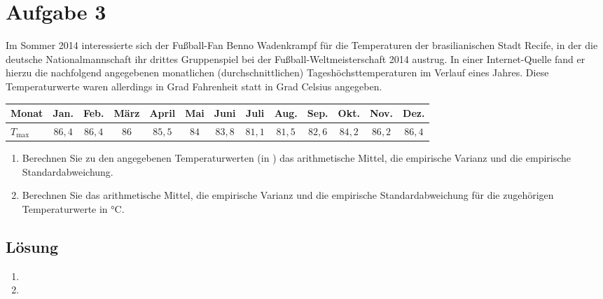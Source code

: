 \documentclass{exercise}
\begin{document}
    \section*{Aufgabe 3}

    \begin{problem}
        Im Sommer 2014 interessierte sich der Fußball-Fan Benno Wadenkrampf für die Temperaturen der brasilianischen Stadt Recife, in der die deutsche Nationalmannschaft ihr drittes Gruppenspiel bei der Fußball-Weltmeisterschaft 2014 austrug.
        In einer Internet-Quelle fand er hierzu die nachfolgend angegebenen monatlichen (durchschnittlichen) Tageshöchsttemperaturen im Verlauf eines Jahres.
        Diese Temperaturwerte waren allerdings in Grad Fahrenheit statt in Grad Celsius angegeben.
        \begin{center}
            \begin{tabular}{lcccccccccccc}
                \toprule
                Monat & Jan. & Feb. & März & April & Mai & Juni & Juli & Aug. & Sep. & Okt. & Nov. & Dez.\\
                \midrule
                \(T_{\text{max}}\) & \(86,4\) & \(86,4\) & \(86\) & \(85,5\) & \(84\) & \(83,8\) & \(81,1\) & \(81,5\) & \(82,6\) & \(84,2\) & \(86,2\) & \(86,4\)\\
                \bottomrule
            \end{tabular}
        \end{center}
        \begin{enumerate}
            \item Berechnen Sie zu den angegebenen Temperaturwerten (in \si{\degreeFahrenheit}) das arithmetische Mittel, die empirische Varianz und die empirische Standardabweichung.
            \item Berechnen Sie das arithmetische Mittel, die empirische Varianz und die empirische Standardabweichung für die zugehörigen Temperaturwerte in \si{\degreeCelsius}.
        \end{enumerate}
    \end{problem}

    \subsection*{Lösung}
    \begin{enumerate}
        \item
        \item 
    \end{enumerate}
\end{document}
